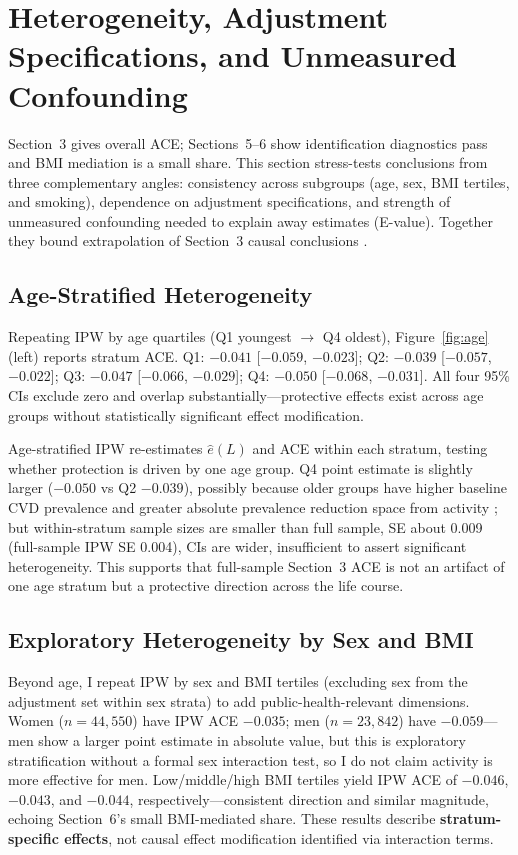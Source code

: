 \documentclass[12pt,a4paper]{article}
\begin{document}
\section{Heterogeneity, Adjustment Specifications, and Unmeasured Confounding}

Section~3 gives overall ACE; Sections~5--6 show identification diagnostics pass and BMI mediation is a small share. This section stress-tests conclusions from three complementary angles: consistency across subgroups (age, sex, BMI tertiles, and smoking), dependence on adjustment specifications, and strength of unmeasured confounding needed to explain away estimates (E-value). Together they bound extrapolation of Section~3 causal conclusions \cite{vanderweele2017evalue,hernan2024whatif}.

\subsection{Age-Stratified Heterogeneity}

Repeating IPW by age quartiles (Q1 youngest $\to$ Q4 oldest), Figure~\ref{fig:age} (left) reports stratum ACE. Q1: $-0.041$ [$-0.059$, $-0.023$]; Q2: $-0.039$ [$-0.057$, $-0.022$]; Q3: $-0.047$ [$-0.066$, $-0.029$]; Q4: $-0.050$ [$-0.068$, $-0.031$]. All four 95\% CIs exclude zero and overlap substantially---protective effects exist across age groups without statistically significant effect modification.

Age-stratified IPW re-estimates $\hat e(L)$ and ACE within each stratum, testing whether protection is driven by one age group. Q4 point estimate is slightly larger ($-0.050$ vs Q2 $-0.039$), possibly because older groups have higher baseline CVD prevalence and greater absolute prevalence reduction space from activity \cite{mi2025creview}; but within-stratum sample sizes are smaller than full sample, SE about 0.009 (full-sample IPW SE 0.004), CIs are wider, insufficient to assert significant heterogeneity. This supports that full-sample Section~3 ACE is not an artifact of one age stratum but a protective direction across the life course.

\subsection{Exploratory Heterogeneity by Sex and BMI}

Beyond age, I repeat IPW by sex and BMI tertiles (excluding sex from the adjustment set within sex strata) to add public-health-relevant dimensions. Women ($n=44{,}550$) have IPW ACE $-0.035$; men ($n=23{,}842$) have $-0.059$---men show a larger point estimate in absolute value, but this is exploratory stratification without a formal sex interaction test, so I do not claim activity is more effective for men. Low/middle/high BMI tertiles yield IPW ACE of $-0.046$, $-0.043$, and $-0.044$, respectively---consistent direction and similar magnitude, echoing Section~6's small BMI-mediated share. These results describe \textbf{stratum-specific effects}, not causal effect modification identified via interaction terms.
\end{document}
